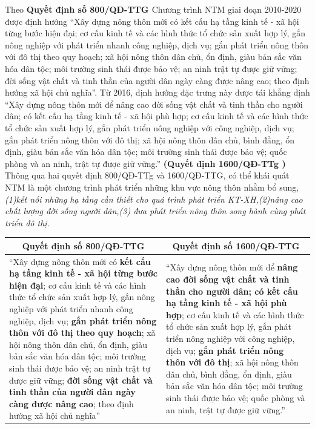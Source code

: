 \documentclass[../thesis.tex]{subfiles}
\begin{document}
Theo \textbf{Quyết định số 800/QĐ-TTG \cite{qd800}} Chương trình NTM giai đoạn 2010-2020 được định hướng “Xây dựng nông thôn mới có kết cấu hạ tầng kinh tế - xã hội từng bước hiện đại; cơ cấu kinh tế và các hình thức tổ chức sản xuất hợp lý, gắn nông nghiệp với phát triển nhanh công nghiệp, dịch vụ; gắn phát triển nông thôn với đô thị theo quy hoạch; xã hội nông thôn dân chủ, ổn định, giàu bản sắc văn hóa dân tộc; môi trường sinh thái được bảo vệ; an ninh trật tự được giữ vững; đời sống vật chất và tinh thần của người dân ngày càng được nâng cao; theo định hướng xã hội chủ nghĩa”. Từ 2016, định hướng đặc trưng này được tái khẳng định “Xây dựng nông thôn mới để nâng cao đời sống vật chất và tinh thần cho người dân; có kết cấu hạ tầng kinh tế - xã hội phù hợp; cơ cấu kinh tế và các hình thức tổ chức sản xuất hợp lý, gắn phát triển nông nghiệp với công nghiệp, dịch vụ; gắn phát triển nông thôn với đô thị; xã hội nông thôn dân chủ, bình đẳng, ổn định, giàu bản sắc văn hóa dân tộc; môi trường sinh thái được bảo vệ; quốc phòng và an ninh, trật tự được giữ vững.”\textbf{ (Quyết định 1600/QĐ-TTg \cite{qd1600})}\\

Thông qua hai quyết định 800/QĐ-TTg và 1600/QĐ-TTG, có thể khái quát NTM là một chương trình phát triển những khu vực nông thôn nhằm bổ sung, \textit{(1)kết nối những hạ tầng cần thiết cho quá trình phát triển KT-XH,(2)nâng cao chất lượng đời sống người dân,(3) đưa phát triển nông thôn song hành cùng phát triển đô thị.}


\begin{tabular}{ | m{7.5cm} | m{7.5cm}| } 
\hline      
\multicolumn{1}{|c|}{\textbf{Quyết định số 800/QĐ-TTG}}& \multicolumn{1}{c|}{\textbf{Quyết định số 1600/QĐ-TTG}} \\
\hline  
“Xây dựng nông thôn mới có \textbf{kết cấu hạ tầng kinh tế - xã hội từng bước hiện đại}; cơ cấu kinh tế và các hình thức tổ chức sản xuất hợp lý, gắn nông nghiệp với phát triển nhanh công nghiệp, dịch vụ;\textbf{ gắn phát triển nông thôn với đô thị theo quy hoạch}; xã hội nông thôn dân chủ, ổn định, giàu bản sắc văn hóa dân tộc; môi trường sinh thái được bảo vệ; an ninh trật tự được giữ vững;\textbf{ đời sống vật chất và tinh thần của người dân ngày càng được nâng cao}; theo định hướng xã hội chủ nghĩa” & “Xây dựng nông thôn mới để \textbf{nâng cao đời sống vật chất và tinh thần cho người dân; có kết cấu hạ tầng kinh tế - xã hội phù hợp}; cơ cấu kinh tế và các hình thức tổ chức sản xuất hợp lý, gắn phát triển nông nghiệp với công nghiệp, dịch vụ; \textbf{gắn phát triển nông thôn với đô thị}; xã hội nông thôn dân chủ, bình đẳng, ổn định, giàu bản sắc văn hóa dân tộc; môi trường sinh thái được bảo vệ; quốc phòng và an ninh, trật tự được giữ vững.”\\
\hline 
\end{tabular} \\
\end{document}
